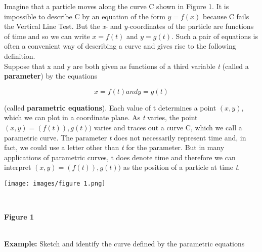 \documentclass{article}
\begin{document}
Imagine that a particle moves along the curve C shown in Figure 1. It is impossible to describe C by an equation of the form \begin{math} y = f(x)\end{math} because C fails the Vertical Line Test. But the \textsl{x}- and \textsl{y-}coordinates of the particle are functions of time and so we can write \begin{math}
x = f(t)\end{math} and \begin{math} y = g(t) \end{math}. Such a pair of equations is often a convenient way of describing a curve and gives rise to the following definition.\\
\indent\setlength{\parindent}{1em} Suppose that x and y are both given as functions of a third variable \textsl{t} (called a \textbf{parameter}) by the equations
\begin{center}
\begin{equation*}
    x = f(t) and y = g(t)
\end{equation*}
\end{center}
(called \textbf{parametric equations}). Each value of t determines a point \begin{math} (x, y)\end{math},  which we can plot in a coordinate plane. As \textsl{t} varies, the point \begin{math} (x, y) = (f(t)), g(t)) \end{math} varies and traces out a curve C, which we call a parametric curve. The parameter \textsl{t} does not necessarily represent time and, in fact, we could use a letter other than \textsl{t} for the parameter. But in many applications of parametric curves, t does denote time and therefore we can interpret \begin{math} (x, y) = (f(t)), g(t)) \end{math} as the position of a particle at time \textsl{t}.\\
\begin{center}
    
\texttt{[image: images/figure 1.png]}
\end{center}\\

\begin{center}
\textbf{Figure 1}
\end{center}\\

\textbf{Example:} Sketch and identify the curve defined by the parametric equations
\end{document}
